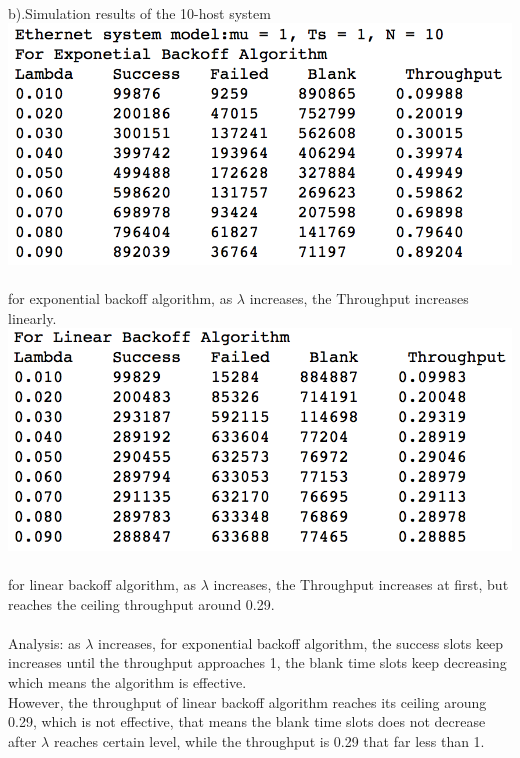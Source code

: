 \documentclass[paper=a4, fontsize=11pt]{scrartcl}
\numberwithin{equation}{section} %
\numberwithin{figure}{section} %
\numberwithin{table}{section} %
\begin{document}
    \\b).Simulation results of the 10-host system\\
        \includegraphics[scale=0.8]{c}\\\\
        for exponential backoff algorithm, as $\lambda$ increases, the Throughput increases linearly.
        \includegraphics[scale=0.8]{d}\\\\
        for linear backoff algorithm, as $\lambda$ increases, the Throughput increases at first, but reaches the ceiling throughput around 0.29.\\\\
        Analysis: as $\lambda$ increases, for exponential backoff algorithm, the success slots keep increases until the throughput approaches 1, the blank time slots keep decreasing which means the algorithm is effective.\\
        However, the throughput of linear backoff algorithm reaches its ceiling aroung 0.29, which is not effective, that means the blank time slots does not decrease after $\lambda$ reaches certain level, while the throughput is 0.29 that far less than 1.
\end{document}
